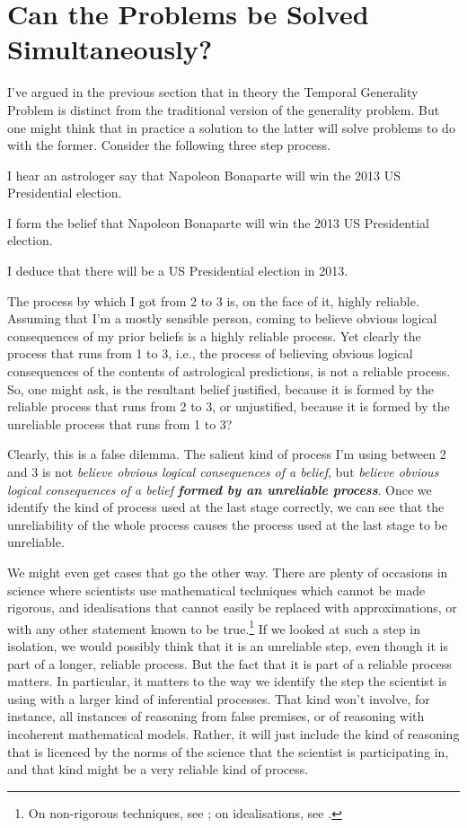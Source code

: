 \documentclass[11pt,oneside]{book}
\begin{document}
\section{Can the Problems be Solved Simultaneously?}

I've argued in the previous section that in theory the Temporal Generality Problem is distinct from the traditional version of the generality problem. But one might think that in practice a solution to the latter will solve problems to do with the former. Consider the following three step process.

\begin{enumerate*}
\item I hear an astrologer say that Napoleon Bonaparte will win the 2013 US Presidential election.
\item I form the belief that Napoleon Bonaparte will win the 2013 US Presidential election.
\item I deduce that there will be a US Presidential election in 2013.
\end{enumerate*}

\noindent The process by which I got from 2 to 3 is, on the face of it, highly reliable. Assuming that I'm a mostly sensible person, coming to believe obvious logical consequences of my prior beliefs is a highly reliable process. Yet clearly the process that runs from 1 to 3, i.e., the process of believing obvious logical consequences of the contents of astrological predictions, is not a reliable process. So, one might ask, is the resultant belief justified, because it is formed by the reliable process that runs from 2 to 3, or unjustified, because it is formed by the unreliable process that runs from 1 to 3?

Clearly, this is a false dilemma. The salient kind of process I'm using between 2 and 3 is not \textit{believe obvious logical consequences of a belief}, but \textit{believe obvious logical consequences of a belief \textbf{formed by an unreliable process}}. Once we identify the kind of process used at the last stage correctly, we can see that the unreliability of the whole process causes the process used at the last stage to be unreliable.

We might even get cases that go the other way. There are plenty of occasions in science where scientists use mathematical techniques which cannot be made rigorous, and idealisations that cannot easily be replaced with approximations, or with any other statement known to be true.\footnote{On non-rigorous techniques, see \cite{Davey2003}; on idealisations, see \cite{Davey2011}.} If we looked at such a step in isolation, we would possibly think that it is an unreliable step, even though it is part of a longer, reliable process. But the fact that it is part of a reliable process matters. In particular, it matters to the way we identify the step the scientist is using with a larger kind of inferential processes. That kind won't involve, for instance, all instances of reasoning from false premises, or of reasoning with incoherent mathematical models. Rather, it will just include the kind of reasoning that is licenced by the norms of the science that the scientist is participating in, and that kind might be a very reliable kind of process.
\end{document}
